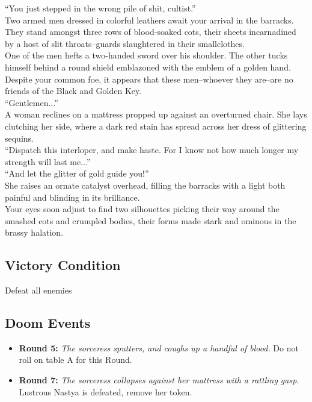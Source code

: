 “You just stepped in the wrong pile of shit, cultist.”\\

Two armed men dressed in colorful leathers await your arrival in the barracks. They stand amongst three rows of blood-soaked cots, their sheets incarnadined by a host of slit throats--guards slaughtered in their smallclothes.\\

One of the men hefts a two-handed sword over his shoulder. The other tucks himself behind a round shield emblazoned with the emblem of a golden hand. Despite your common foe, it appears that these men--whoever they are--are no friends of the Black and Golden Key.\\

“Gentlemen...”\\

A woman reclines on a mattress propped up against an overturned chair. She lays clutching her side, where a dark red stain has spread across her dress of glittering sequins.\\

“Dispatch this interloper, and make haste. For I know not how much longer my strength will last me...”\\

“And let the glitter of gold guide you!”\\
She raises an ornate catalyst overhead, filling the barracks with a light both painful and blinding in its brilliance.\\

Your eyes soon adjust to find two silhouettes picking their way around the smashed cots and crumpled bodies, their forms made stark and ominous in the brassy halation.\\

\subsection*{Victory Condition}
Defeat all enemies

\subsection*{Doom Events}
\begin{itemize}
\item \textbf{Round 5:} \emph{The sorceress sputters, and coughs up a handful of blood.} Do not roll on table A for this Round.
\item \textbf{Round 7:} \emph{The sorceress collapses against her mattress with a rattling gasp.} Lustrous Nastya is defeated, remove her token.
\end{itemize}

